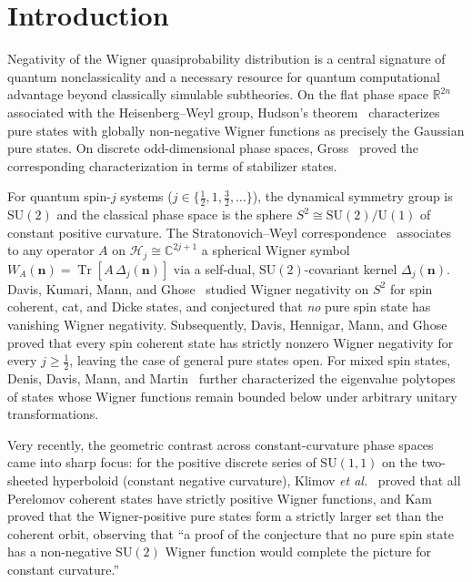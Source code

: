 \documentclass[11pt,a4paper]{article}
\theoremstyle{remark}
\newcommand{\Tr}{\operatorname{Tr}}
\newcommand{\bn}{\mathbf{n}}
\begin{document}
\section{Introduction}

Negativity of the Wigner quasiprobability distribution is a central signature of quantum nonclassicality and a necessary resource for quantum computational advantage beyond classically simulable subtheories. On the flat phase space $\mathbb{R}^{2n}$ associated with the Heisenberg--Weyl group, Hudson's theorem~\cite{Hudson1974,SotoClaverie1983} characterizes pure states with globally non-negative Wigner functions as precisely the Gaussian pure states. On discrete odd-dimensional phase spaces, Gross~\cite{Gross2006} proved the corresponding characterization in terms of stabilizer states.

For quantum spin-$j$ systems ($j \in \{\frac{1}{2}, 1, \frac{3}{2}, \dots\}$), the dynamical symmetry group is $\mathrm{SU}(2)$ and the classical phase space is the sphere $S^2 \cong \mathrm{SU}(2)/\mathrm{U}(1)$ of constant positive curvature. The Stratonovich--Weyl correspondence~\cite{Stratonovich1957,VarillyGraciaBondia1989,BrifMann1999} associates to any operator $A$ on $\mathcal{H}_j \cong \mathbb{C}^{2j+1}$ a spherical Wigner symbol $W_A(\bn) = \Tr[A\,\Delta_j(\bn)]$ via a self-dual, $\mathrm{SU}(2)$-covariant kernel $\Delta_j(\bn)$. Davis, Kumari, Mann, and Ghose~\cite{Davis2021} studied Wigner negativity on $S^2$ for spin coherent, cat, and Dicke states, and conjectured that \emph{no} pure spin state has vanishing Wigner negativity. Subsequently, Davis, Hennigar, Mann, and Ghose~\cite{Davis2023} proved that every spin coherent state has strictly nonzero Wigner negativity for every $j \ge \frac{1}{2}$, leaving the case of general pure states open. For mixed spin states, Denis, Davis, Mann, and Martin~\cite{Denis2024} further characterized the eigenvalue polytopes of states whose Wigner functions remain bounded below under arbitrary unitary transformations.

Very recently, the geometric contrast across constant-curvature phase spaces came into sharp focus: for the positive discrete series of $\mathrm{SU}(1,1)$ on the two-sheeted hyperboloid (constant negative curvature), Klimov \emph{et al.}~\cite{Klimov2026} proved that all Perelomov coherent states have strictly positive Wigner functions, and Kam~\cite{Kam2026} proved that the Wigner-positive pure states form a strictly larger set than the coherent orbit, observing that ``a proof of the conjecture that no pure spin state has a non-negative $\mathrm{SU}(2)$ Wigner function would complete the picture for constant curvature.''
\end{document}
